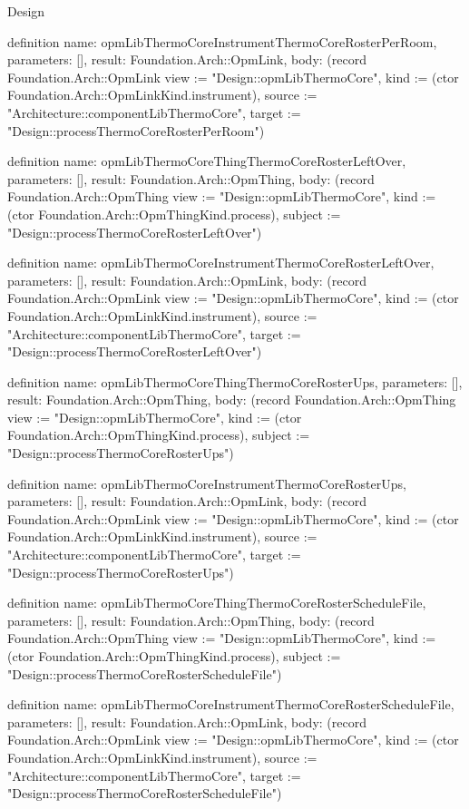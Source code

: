 \begin{lexlean}{Design}
\begin{semanticmodule}
definition{
  name: opmLibThermoCoreInstrumentThermoCoreRosterPerRoom,
  parameters: [],
  result: Foundation.Arch::OpmLink,
  body: (record Foundation.Arch::OpmLink {view := "Design::opmLibThermoCore", kind := (ctor Foundation.Arch::OpmLinkKind.instrument), source := "Architecture::componentLibThermoCore", target := "Design::processThermoCoreRosterPerRoom"})
}

definition{
  name: opmLibThermoCoreThingThermoCoreRosterLeftOver,
  parameters: [],
  result: Foundation.Arch::OpmThing,
  body: (record Foundation.Arch::OpmThing {view := "Design::opmLibThermoCore", kind := (ctor Foundation.Arch::OpmThingKind.process), subject := "Design::processThermoCoreRosterLeftOver"})
}

definition{
  name: opmLibThermoCoreInstrumentThermoCoreRosterLeftOver,
  parameters: [],
  result: Foundation.Arch::OpmLink,
  body: (record Foundation.Arch::OpmLink {view := "Design::opmLibThermoCore", kind := (ctor Foundation.Arch::OpmLinkKind.instrument), source := "Architecture::componentLibThermoCore", target := "Design::processThermoCoreRosterLeftOver"})
}

definition{
  name: opmLibThermoCoreThingThermoCoreRosterUps,
  parameters: [],
  result: Foundation.Arch::OpmThing,
  body: (record Foundation.Arch::OpmThing {view := "Design::opmLibThermoCore", kind := (ctor Foundation.Arch::OpmThingKind.process), subject := "Design::processThermoCoreRosterUps"})
}

definition{
  name: opmLibThermoCoreInstrumentThermoCoreRosterUps,
  parameters: [],
  result: Foundation.Arch::OpmLink,
  body: (record Foundation.Arch::OpmLink {view := "Design::opmLibThermoCore", kind := (ctor Foundation.Arch::OpmLinkKind.instrument), source := "Architecture::componentLibThermoCore", target := "Design::processThermoCoreRosterUps"})
}

definition{
  name: opmLibThermoCoreThingThermoCoreRosterScheduleFile,
  parameters: [],
  result: Foundation.Arch::OpmThing,
  body: (record Foundation.Arch::OpmThing {view := "Design::opmLibThermoCore", kind := (ctor Foundation.Arch::OpmThingKind.process), subject := "Design::processThermoCoreRosterScheduleFile"})
}

definition{
  name: opmLibThermoCoreInstrumentThermoCoreRosterScheduleFile,
  parameters: [],
  result: Foundation.Arch::OpmLink,
  body: (record Foundation.Arch::OpmLink {view := "Design::opmLibThermoCore", kind := (ctor Foundation.Arch::OpmLinkKind.instrument), source := "Architecture::componentLibThermoCore", target := "Design::processThermoCoreRosterScheduleFile"})
}


\end{semanticmodule}
\end{lexlean}
